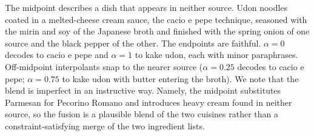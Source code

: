 The midpoint describes a dish that appears in neither source. Udon noodles coated in a melted-cheese cream sauce, the cacio e pepe technique, seasoned with the mirin and soy of the Japanese broth and finished with the spring onion of one source and the black pepper of the other. The endpoints are faithful. $\alpha=0$ decodes to cacio e pepe and $\alpha=1$ to kake udon, each with minor paraphrases. Off-midpoint interpolants snap to the nearer source ($\alpha=0.25$ decodes to cacio e pepe; $\alpha=0.75$ to kake udon with butter entering the broth).
We note that the blend is imperfect in an instructive way. Namely, the midpoint substitutes Parmesan for Pecorino Romano and introduces heavy cream found in neither source, so the fusion is a plausible blend of the two cuisines rather than a constraint-satisfying merge of the two ingredient lists.
